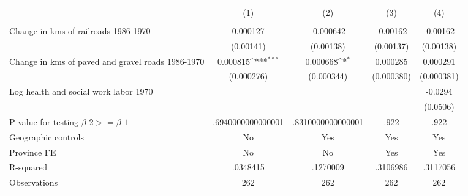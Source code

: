 {
\def\sym#1{\ifmmode^{#1}\else\(^{#1}\)\fi}
\begin{tabular}{l*{4}{c}}
\hline\hline
                &\multicolumn{1}{c}{(1)}&\multicolumn{1}{c}{(2)}&\multicolumn{1}{c}{(3)}&\multicolumn{1}{c}{(4)}\\
                &\multicolumn{1}{c}{}&\multicolumn{1}{c}{}&\multicolumn{1}{c}{}&\multicolumn{1}{c}{}\\
\hline
Change in kms of railroads 1986-1970& 0.000127         &-0.000642         & -0.00162         & -0.00162         \\
                &(0.00141)         &(0.00138)         &(0.00137)         &(0.00138)         \\
[1em]
Change in kms of paved and gravel roads 1986-1970& 0.000815\sym{***}& 0.000668\sym{*}  & 0.000285         & 0.000291         \\
                &(0.000276)         &(0.000344)         &(0.000380)         &(0.000381)         \\
[1em]
Log health and social work labor 1970&                  &                  &                  &  -0.0294         \\
                &                  &                  &                  & (0.0506)         \\
\hline
P-value for testing $\beta\_{2} >= \beta\_{1}$&.6940000000000001         &.8310000000000001         &     .922         &     .922         \\
Geographic controls&       No         &      Yes         &      Yes         &      Yes         \\
Province FE     &       No         &       No         &      Yes         &      Yes         \\
R-squared       & .0348415         & .1270009         & .3106986         & .3117056         \\
Observations    &      262         &      262         &      262         &      262         \\
\hline\hline
\end{tabular}
}
